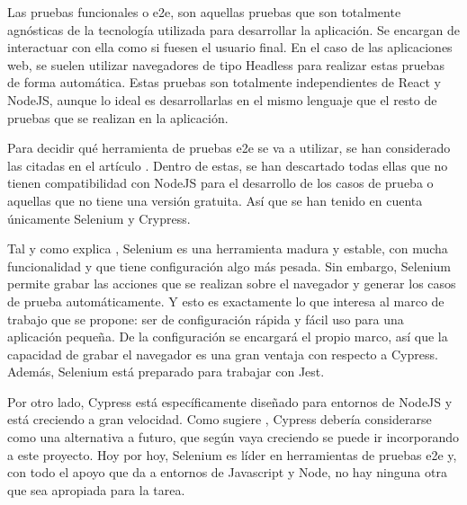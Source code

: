 Las pruebas funcionales o \gls{e2e}, son aquellas pruebas que son totalmente agnósticas de la tecnología utilizada para desarrollar la aplicación. Se encargan de interactuar con ella como si fuesen el usuario final. En el caso de las aplicaciones web, se suelen utilizar navegadores de tipo Headless para realizar estas pruebas de forma automática. Estas pruebas son totalmente independientes de React y NodeJS, aunque lo ideal es desarrollarlas en el mismo lenguaje que el resto de pruebas que se realizan en la aplicación.

Para decidir qué herramienta de pruebas \gls{e2e} se va a utilizar, se han considerado las citadas en el artículo \cite{MPSFT19}. Dentro de estas, se han descartado todas ellas que no tienen compatibilidad con NodeJS para el desarrollo de los casos de prueba o aquellas que no tiene una versión gratuita. Así que se han tenido en cuenta únicamente Selenium y Crypress.

Tal y como explica \citet{CYPVSEL}, Selenium es una herramienta madura y estable, con mucha funcionalidad y que tiene configuración algo más pesada. Sin embargo, Selenium permite grabar las acciones que se realizan sobre el navegador y generar los casos de prueba automáticamente. Y esto es exactamente lo que interesa al marco de trabajo que se propone: ser de configuración rápida y fácil uso para una aplicación pequeña. De la configuración se encargará el propio marco, así que la capacidad de grabar el navegador es una gran ventaja con respecto a Cypress. Además, Selenium está preparado para trabajar con Jest.

Por otro lado, Cypress está específicamente diseñado para entornos de NodeJS y está creciendo a gran velocidad. Como sugiere \citet{CYPVSEL}, Cypress debería considerarse como una alternativa a futuro, que según vaya creciendo se puede ir incorporando a este proyecto. Hoy por hoy, Selenium es líder en herramientas de pruebas \gls{e2e} y, con todo el apoyo que da a entornos de Javascript y Node, no hay ninguna otra que sea apropiada para la tarea.
